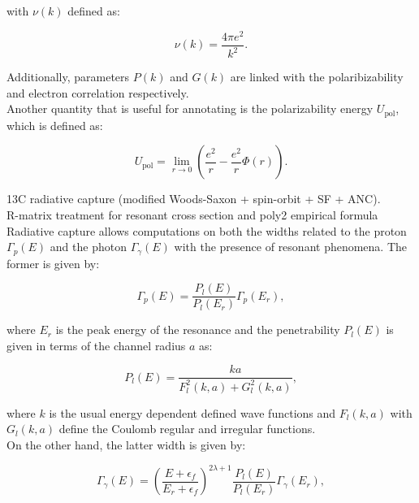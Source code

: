 \documentclass[openany]{book}
\begin{document}
with $\nu(k)$ defined as: 

\begin{equation}\label{eq:potential_screening_nu}
	\nu(k) = \frac{4\pi e^2}{k^2}.
\end{equation}

Additionally, parameters $P(k)$ and $G(k)$ are linked with the polaribizability and electron correlation respectively. \\

Another quantity that is useful for annotating is the polarizability energy $U_{\mathrm{pol}}$, which is defined as: 

\begin{equation}\label{eq:potential_screening_Upolarizability}
	U_{\mathrm{pol}} = \lim_{r \rightarrow 0 } {\left(\frac{e^2}{r} - \frac{e^2}{r} \Phi(r) \right)}.
\end{equation}


13C radiative capture (modified Woods-Saxon + spin-orbit + SF + ANC). \\

R-matrix treatment for resonant cross section and poly2 empirical formula \cite{kabir_irgaziev_nabi_2020} \\

Radiative capture allows computations on both the widths related to the proton $\Gamma_p(E)$ and the photon $\Gamma_\gamma(E)$ with the presence of resonant phenomena. The former is given by: 

\begin{equation}\label{eq:potential_radiative_width_proton}
	\Gamma_p(E)  = \frac{P_l(E)}{P_l(E_r)}  \Gamma_p(E_r),
\end{equation}

where $E_r$ is the peak energy of the resonance and the penetrability $P_l(E)$ is given in terms of the channel radius $a$ as: 

\begin{equation}\label{eq:potential_radiative_penetrability}
	P_l (E) = \frac{ka}{F^2_l(k, a) + G^2_l(k, a)},
\end{equation}

where $k$ is the usual energy dependent defined wave functions and $F_l(k, a)$ with $G_l(k, a)$ define the Coulomb regular and irregular functions.  \\

On the other hand, the latter width is given by:

\begin{equation}\label{eq:potential_radiative_width_photon}
	\Gamma_\gamma(E)  =  \left(\frac{E + \epsilon_f}{E_r + \epsilon_f}\right)^{2\lambda + 1} \frac{P_l(E)}{P_l(E_r)}  \Gamma_\gamma(E_r),
\end{equation}
\end{document}
